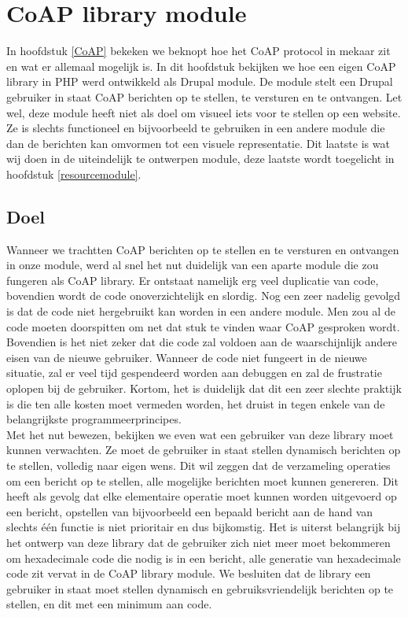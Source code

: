 \chapter{CoAP library module} \label{coaplibrary}

In hoofdstuk \ref{CoAP} bekeken we beknopt hoe het CoAP protocol in mekaar zit en wat er allemaal mogelijk is. In dit hoofdstuk bekijken we hoe een eigen CoAP library in PHP werd ontwikkeld als Drupal module. De module stelt een Drupal gebruiker in staat CoAP berichten op te stellen, te versturen en te ontvangen. Let wel, deze module heeft niet als doel om visueel iets voor te stellen op een website. Ze is slechts functioneel en bijvoorbeeld te gebruiken in een andere module die dan de berichten kan omvormen tot een visuele representatie. Dit laatste is wat wij doen in de uiteindelijk te ontwerpen module, deze laatste wordt toegelicht in hoofdstuk \ref{resourcemodule}.

\section{Doel}

Wanneer we trachtten CoAP berichten op te stellen en te versturen en ontvangen in onze module, werd al snel het nut duidelijk van een aparte module die zou fungeren als CoAP library. Er ontstaat namelijk erg veel duplicatie van code, bovendien wordt de code onoverzichtelijk en slordig. Nog een zeer nadelig gevolgd is dat de code niet hergebruikt kan worden in een andere module. Men zou al de code moeten doorspitten om net dat stuk te vinden waar CoAP gesproken wordt. Bovendien is het niet zeker dat die code zal voldoen aan de waarschijnlijk andere eisen van de nieuwe gebruiker. Wanneer de code niet fungeert in de nieuwe situatie, zal er veel tijd gespendeerd worden aan debuggen en zal de frustratie oplopen bij de gebruiker. Kortom, het is duidelijk dat dit een zeer slechte praktijk is die ten alle kosten moet vermeden worden, het druist in tegen enkele van de belangrijkste programmeerprincipes.\\

Met het nut bewezen, bekijken we even wat een gebruiker van deze library moet kunnen verwachten. Ze moet de gebruiker in staat stellen dynamisch berichten op te stellen, volledig naar eigen wens. Dit wil zeggen dat de verzameling operaties om een bericht op te stellen, alle mogelijke berichten moet kunnen genereren. Dit heeft als gevolg dat elke elementaire operatie moet kunnen worden uitgevoerd op een bericht, opstellen van bijvoorbeeld een bepaald bericht aan de hand van slechts één functie is niet prioritair en dus bijkomstig. Het is uiterst belangrijk bij het ontwerp van deze library dat de gebruiker zich niet meer moet bekommeren om hexadecimale code die nodig is in een bericht, alle generatie van hexadecimale code zit vervat in de CoAP library module. We besluiten dat de library een gebruiker in staat moet stellen dynamisch en gebruiksvriendelijk berichten op te stellen, en dit met een minimum aan code.

